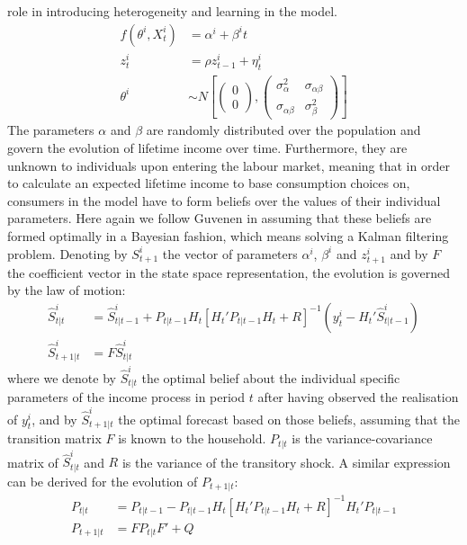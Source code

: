 role in introducing heterogeneity and learning in the model.
\begin{align*}
f(\theta^i, X_t^i) &= \alpha^i + \beta^i t \\
z_t^i &= \rho z_{t-1}^i + \eta_t^i \\
\theta^i &\sim N \left[ \begin{pmatrix} 0 \\ 0 \end{pmatrix}, \begin{pmatrix} \sigma_{\alpha}^2 & \sigma_{\alpha \beta} \\ \sigma_{\alpha \beta} & \sigma_{\beta}^2 \end{pmatrix} \right]
\end{align*}
The parameters $\alpha$ and $\beta$ are randomly distributed over the population 
and govern the evolution of lifetime income over time. Furthermore, they are 
unknown to individuals upon entering the labour market, meaning that in order to
 calculate an expected lifetime income to base consumption choices on, consumers 
in the model have to form beliefs over the values of their individual parameters. 
Here again we follow Guvenen in assuming that these beliefs are formed optimally
in a Bayesian fashion, which means solving a Kalman filtering problem. 
Denoting by $S^i_{t+1}$ the vector of parameters $\alpha^i$, $\beta^i$ and 
$z^i_{t+1}$ and by $F$ the coefficient vector in the state space representation,
the evolution is governed by the law of motion:
\begin{align}
\hat{S}^i_{t|t} &= \hat{S}^i_{t|t-1} + P_{t|t-1} H_t [H_t' P_{t|t-1} H_t + R]^{-1}(y_t^i - H_t' \hat{S}^i_{t|t-1}) \label{eq:KFS} \\
\hat{S}^i_{t+1|t} &= F \hat{S}^i_{t|t} \label{eq:TES}
\end{align}
where we denote by $\hat{S}^i_{t|t}$ the optimal belief about the individual specific
parameters of the income process in period $t$ after having observed the realisation
of $y_t^i$, and by $\hat{S}^i_{t+1|t}$ the optimal forecast based on those beliefs,
assuming that the transition matrix $F$ is known to the household. $P_{t|t}$ is 
the variance-covariance matrix of $\hat{S}^i_{t|t}$ and $R$  is the variance of 
the transitory shock. A similar expression can be derived for the evolution of 
$P_{t+1|t}$:
\begin{align}
P_{t|t} &= P_{t|t-1} - P_{t|t-1} H_t [ H_t' P_{t|t-1} H_t + R]^{-1} H_t' P_{t|t-1} \label{eq:KFP} \\
P_{t+1|t} &= F P_{t|t} F' + Q \label{eq:TEP}
\end{align}
